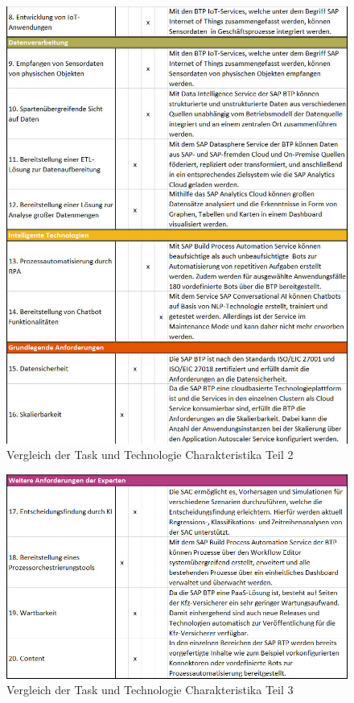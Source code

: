 \FloatBarrier

\begin{figure}[ht]
    \centering
    \includegraphics[width=1\textwidth]{img/TTFTeil2E.jpg}
    \caption[Vergleich der Task und Technologie Charakteristika Teil 2]{Vergleich der Task und Technologie Charakteristika Teil 2\autocite{TFTeil2}}
    \label{fig:TTFTeil2}
\end{figure}

\FloatBarrier

\begin{figure}[ht]
    \centering
    \includegraphics[width=1\textwidth]{img/TTFTeil3E.jpg}
    \caption[Vergleich der Task und Technologie Charakteristika Teil 3]{Vergleich der Task und Technologie Charakteristika Teil 3\autocite{TFTeil3}}
    \label{fig:TTFTeil3}
\end{figure}

